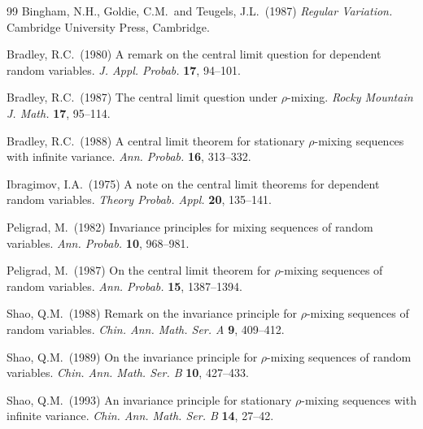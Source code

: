 \documentclass[11pt,a4,leqno]{amsart}
\newcommand{\1}{{\mathbf 1}}
\begin{document}
\begin{thebibliography}{99}
{\sc Bingham, N.H., Goldie, C.M.\ and Teugels, J.L.}\ (1987) {\em
Regular Variation.} Cambridge University Press, Cambridge.

{\sc Bradley, R.C.}\ (1980)
A remark on the central limit question for dependent random variables.
{\em J. Appl. Probab.} {\bf 17}, 94--101.

{\sc Bradley, R.C.}\ (1987)
The central limit question under $\rho$-mixing.
{\em Rocky Mountain J. Math.} {\bf 17}, 95--114.

{\sc Bradley, R.C.}\ (1988)
A central limit theorem for stationary $\rho$-mixing sequences with infinite variance.
{\em Ann. Probab.} {\bf 16}, 313--332.

{\sc Ibragimov, I.A.}\ (1975)
A note on the central limit theorems for dependent random variables.
{\em Theory Probab. Appl.} {\bf 20}, 135--141.

{\sc Peligrad, M.}\ (1982)
Invariance principles for mixing sequences of random variables.
{\em Ann. Probab.} {\bf 10}, 968--981.

{\sc Peligrad, M.}\ (1987)
On the central limit theorem for $\rho$-mixing sequences of random variables.
{\em Ann. Probab.} {\bf 15}, 1387--1394.

{\sc Shao, Q.M.}\ (1988)
Remark on the invariance principle for $\rho$-mixing sequences of random variables.
{\em Chin. Ann. Math. Ser. A} {\bf 9}, 409--412.

{\sc Shao, Q.M.}\ (1989)
On the invariance principle for $\rho$-mixing sequences of random variables.
{\em Chin. Ann. Math. Ser. B} {\bf 10}, 427--433.

{\sc Shao, Q.M.}\ (1993)
An invariance principle for stationary $\rho$-mixing sequences with infinite variance.
{\em Chin. Ann. Math. Ser. B} {\bf 14}, 27--42.
\end{thebibliography}
\end{document}
